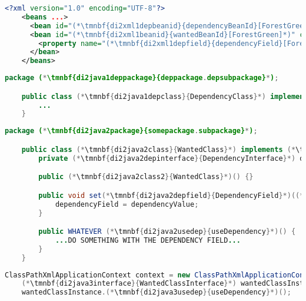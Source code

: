 \begin{lstlisting}[language=XML, title={Configuration XML}]
    <?xml version="1.0" encoding="UTF-8"?>
    <beans ...>
      <bean id="(*\tmnbf{di2xml1depbeanid}{dependencyBeanId}[ForestGreen]*)" class="(*\tmnbf{di2xml1deppackage}{deppackage.depsubpackage}[ForestGreen]*).(*\tmnbf{di2xml1depclass}{DependencyClass}[ForestGreen]*)"/>
      <bean id="(*\tmnbf{di2xml1beanid}{wantedBeanId}[ForestGreen]*)" class="(*\tmnbf{di2xml1package}{somepackage.subpackage}[ForestGreen]*).(*\tmnbf{di2xml1class}{WantedClass}[ForestGreen]*)">
        <property name="(*\tmnbf{di2xml1depfield}{dependencyField}[ForestGreen]*)" ref="(*\tmnbf{di2xml1depbeanid2}{dependencyBeanId}[ForestGreen]*)"/>
      </bean>
    </beans>
\end{lstlisting}
\begin{lstlisting}[language=Java, title={Dependency class}]
    package (*\tmnbf{di2java1deppackage}{deppackage.depsubpackage}*);

    public class (*\tmnbf{di2java1depclass}{DependencyClass}*) implements (*\tmnbf{di2java1depinterface}{DependencyInterface}*) {
        ...
    }
\end{lstlisting}
\begin{lstlisting}[language=Java, title={Wanted class with the zero--parameter constructor and the setter method}]
    package (*\tmnbf{di2java2package}{somepackage.subpackage}*);

    public class (*\tmnbf{di2java2class}{WantedClass}*) implements (*\tmnbf{di2java2interface}{WantedClassInterface}*) {
        private (*\tmnbf{di2java2depinterface}{DependencyInterface}*) dependencyField;

        public (*\tmnbf{di2java2class2}{WantedClass}*)() {}

        public void set(*\tmnbf{di2java2depfield}{DependencyField}*)((*\tmnbf{di2java2depinterface2}{DependencyInterface}*) dependencyValue) {
            dependencyField = dependencyValue;
        }

        public WHATEVER (*\tmnbf{di2java2usedep}{useDependency}*)() {
            ...DO SOMETHING WITH THE DEPENDENCY FIELD...
        }
    }
\end{lstlisting}
\begin{lstlisting}[language=Java, title={Usage}]
    ClassPathXmlApplicationContext context = new ClassPathXmlApplicationContext("configurationFile.xml");
    (*\tmnbf{di2java3interface}{WantedClassInterface}*) wantedClassInstance = context.getBean("(*\tmnbf{di2java3beanid}{wantedBeanId}[ForestGreen]*)", (*\tmnbf{di2java3interface2}{WantedClassInterface}*).class);
    wantedClassInstance.(*\tmnbf{di2java3usedep}{useDependency}*)();
\end{lstlisting}
